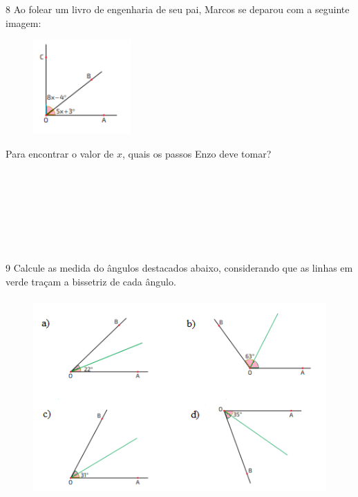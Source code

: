 {{\num{8} Ao folear um livro de engenharia de seu pai, Marcos se deparou com a
seguinte imagem:

\begin{figure}[H]
\centering\includegraphics[width=1.47134in,height=1.42708in]{./imgSAEB_8_MAT/media/image31.png}
\end{figure}

Para encontrar o valor de $x$, quais os passos Enzo deve tomar?

\\
\\
\\
\\
\\
\\

\pagebreak

\num{9} Calcule as medida do ângulos destacados abaixo, considerando que as
linhas em verde traçam a bissetriz de cada ângulo.

\begin{figure}[H]
\centering\includegraphics[width=4.66667in,height=3in]{./imgSAEB_8_MAT/media/image32.png}
\end{figure}

}}
